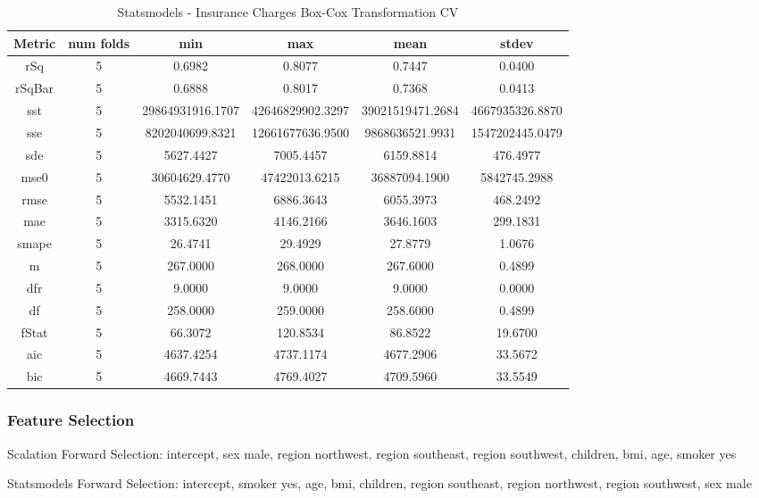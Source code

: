 \documentclass{article}
\begin{document}
\begin{table}[H]
\centering
\caption{Statsmodels - Insurance Charges Box-Cox Transformation CV}
\label{tab:Statsmodels - Insurance Charges Box-Cox Transformation CV}
\begin{tabular}{|c|c|c|c|c|c|}\hline
Metric & num folds & min & max & mean & stdev \\ \hline \hline
rSq & 5 & 0.6982 & 0.8077 & 0.7447 & 0.0400 \\ \hline
rSqBar & 5 & 0.6888 & 0.8017 & 0.7368 & 0.0413 \\ \hline
sst & 5 & 29864931916.1707 & 42646829902.3297 & 39021519471.2684 & 4667935326.8870 \\ \hline
sse & 5 & 8202040699.8321 & 12661677636.9500 & 9868636521.9931 & 1547202445.0479 \\ \hline
sde & 5 & 5627.4427 & 7005.4457 & 6159.8814 & 476.4977 \\ \hline
mse0 & 5 & 30604629.4770 & 47422013.6215 & 36887094.1900 & 5842745.2988 \\ \hline
rmse & 5 & 5532.1451 & 6886.3643 & 6055.3973 & 468.2492 \\ \hline
mae & 5 & 3315.6320 & 4146.2166 & 3646.1603 & 299.1831 \\ \hline
smape & 5 & 26.4741 & 29.4929 & 27.8779 & 1.0676 \\ \hline
m & 5 & 267.0000 & 268.0000 & 267.6000 & 0.4899 \\ \hline
dfr & 5 & 9.0000 & 9.0000 & 9.0000 & 0.0000 \\ \hline
df & 5 & 258.0000 & 259.0000 & 258.6000 & 0.4899 \\ \hline
fStat & 5 & 66.3072 & 120.8534 & 86.8522 & 19.6700 \\ \hline
aic & 5 & 4637.4254 & 4737.1174 & 4677.2906 & 33.5672 \\ \hline
bic & 5 & 4669.7443 & 4769.4027 & 4709.5960 & 33.5549 \\ \hline
\end{tabular}
\end{table}

\subsubsection{Feature Selection}

Scalation Forward Selection: intercept, sex male, region northwest, region southeast, region southwest, children, bmi, age, smoker yes

Statsmodels Forward Selection: intercept, smoker yes, age, bmi, children, region southeast, region northwest, region southwest, sex male
\end{document}
